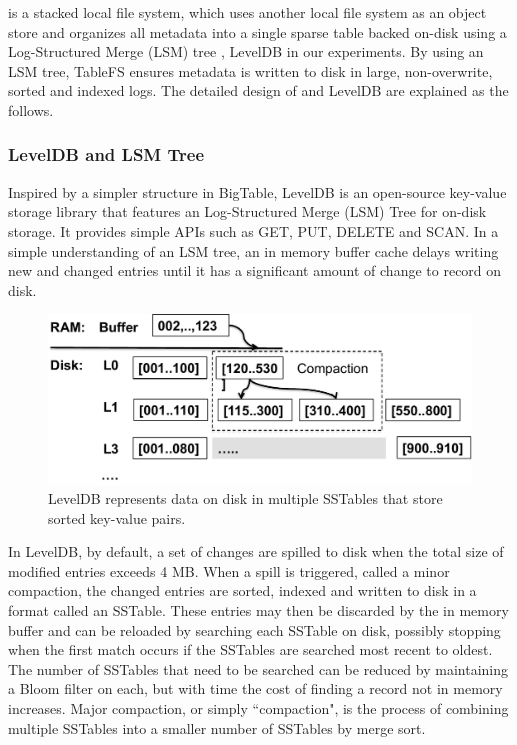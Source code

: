 
\tfs \cite{TableFS} is a stacked local file system, 
which uses another local file system as an object store 
and organizes all metadata into a single sparse table backed on-disk 
using a Log-Structured Merge (LSM) tree \cite{ONeil1996}, LevelDB\cite{LevelDB} in our experiments.
By using an LSM tree, TableFS ensures metadata is written to disk in large, non-overwrite, sorted and indexed logs.
The detailed design of  \tfs and LevelDB are explained as the follows.

\subsubsection*{LevelDB and LSM Tree}
Inspired by a simpler structure in BigTable\citep{BigTable}, 
LevelDB \citep{LevelDB} is an open-source key-value storage library
that features an Log-Structured Merge (LSM) Tree \citep{ONeil1996} for on-disk storage.
It provides simple APIs such as GET, PUT, DELETE and SCAN.
In a simple understanding of an LSM tree, an in memory buffer cache delays 
writing new and changed entries until it has a significant amount of change to record on disk. 

\begin{figure}[!ht]
\centering
\includegraphics[scale=0.4]{figs/leveldb}
\caption{LevelDB represents data on disk in multiple SSTables that store sorted key-value pairs.}
\label{fig:leveldb}
\end{figure}


In LevelDB, by default, a set of changes are spilled to disk when the total size of modified entries exceeds 4 MB.  When a spill is triggered, called a minor compaction, the changed entries are sorted, indexed and written to disk in a format called an SSTable\citep{BigTable}.  These entries may then be discarded by the in memory buffer and can be reloaded by searching each SSTable on disk, possibly stopping when the first match occurs if the SSTables are searched most recent to oldest.  The number of SSTables that need to be searched can be reduced by maintaining a Bloom filter\citep{bloomfilter} on each, but with time the cost of finding a record not in memory increases.  Major compaction, or simply ``compaction", is the process of combining multiple SSTables into a smaller number of SSTables by merge sort. 

